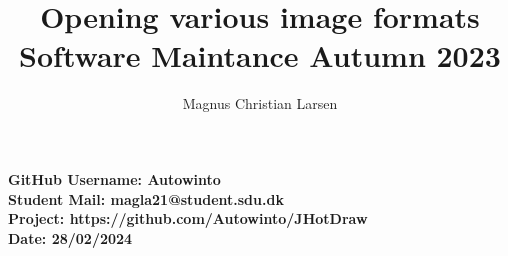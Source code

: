 \documentclass{article}
\title{%
    Opening various image formats\\
    \large Software Maintance Autumn 2023
}
\author{Magnus Christian Larsen}
\begin{document}
\maketitle
\vspace*{\fill}
\begin{center}
    \bf{%
        GitHub Username: Autowinto\\
        Student Mail: magla21@student.sdu.dk\\
        Project: https://github.com/Autowinto/JHotDraw\\
        Date: 28/02/2024}
\end{center}
\newpage
\tableofcontents
\newpage











\printbibliography
\end{document}
